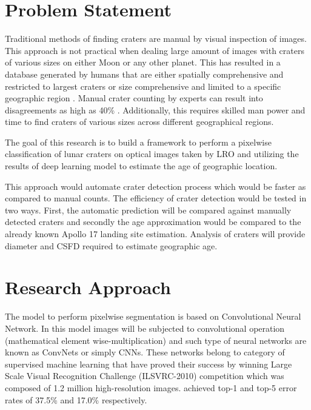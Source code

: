 \documentclass[11pt]{article}
\begin{document}
\section{Problem Statement}
Traditional methods of finding craters are manual by visual inspection of images. This approach is not practical when dealing large amount of images with craters of various sizes on either Moon or any other planet. This has resulted in a database generated by humans that are either spatially comprehensive and restricted to largest craters or size comprehensive and limited to a specific geographic region \cite{stepinski2012detecting}. Manual crater counting by experts can result into disagreements as high as 40\% \cite{greeley1970precision}. Additionally, this requires skilled man power and time to find craters of various sizes across different geographical regions.

The goal of this research is to build a framework to perform a pixelwise classification of lunar craters on optical images taken by LRO and utilizing the results of deep learning model to estimate the age of geographic location.

This approach would automate crater detection process which would be faster as compared to manual counts. The efficiency of crater detection would be tested in two ways. First, the automatic prediction will be compared against manually detected craters and secondly the age approximation would be compared to the already known Apollo 17 landing site estimation. Analysis of craters will provide diameter and CSFD required to estimate geographic age.

\section{Research Approach}
The model to perform pixelwise segmentation is based on Convolutional Neural Network. In this model images will be subjected to convolutional operation (mathematical element wise-multiplication) and such type of neural networks are known as ConvNets or simply CNNs. These networks belong to category of supervised machine learning that have proved their success by winning Large Scale Visual Recognition Challenge (ILSVRC-2010) competition which was composed of 1.2 million high-resolution images. \cite{krizhevsky_imagenet_2012} achieved top-1 and top-5 error rates of 37.5\% and 17.0\% respectively. 
\end{document}

